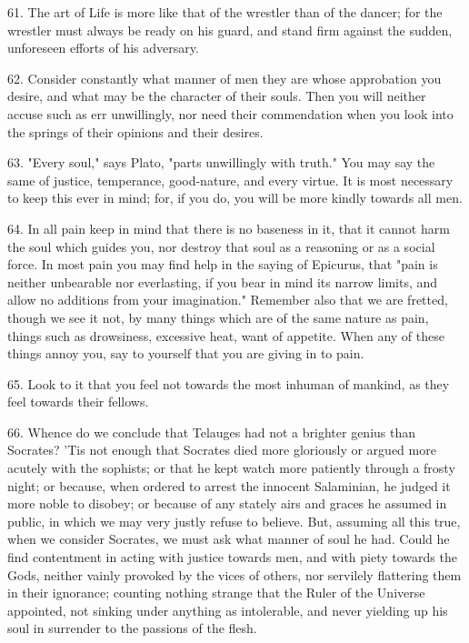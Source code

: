 \documentclass{book}
\begin{document}
61. The art of Life is more like that of the wrestler than of the
dancer; for the wrestler must always be ready on his guard, and stand
firm against the sudden, unforeseen efforts of his adversary.

62. Consider constantly what manner of men they are whose approbation
you desire, and what may be the character of their souls. Then you
will neither accuse such as err unwillingly, nor need their
commendation when you look into the springs of their opinions and
their desires.

63. "Every soul," says Plato, "parts unwillingly with truth." You may
say the same of justice, temperance, good-nature, and every virtue. It
is most necessary to keep this ever in mind; for, if you do, you will
be more kindly towards all men.

64. In all pain keep in mind that there is no baseness in it, that it
cannot harm the soul which guides you, nor destroy that soul as a
reasoning or as a social force. In most pain you may find help in the
saying of Epicurus, that "pain is neither unbearable nor everlasting,
if you bear in mind its narrow limits, and allow no additions from
your imagination." Remember also that we are fretted, though we see it
not, by many things which are of the same nature as pain, things such
as drowsiness, excessive heat, want of appetite. When any of these
things annoy you, say to yourself that you are giving in to pain.

65. Look to it that you feel not towards the most inhuman of mankind,
as they feel towards their fellows.

66. Whence do we conclude that Telauges had not a brighter genius than
Socrates? 'Tis not enough that Socrates died more gloriously or argued
more acutely with the sophists; or that he kept watch more patiently
through a frosty night; or because, when ordered to arrest the
innocent Salaminian, he judged it more noble to disobey; or because of
any stately airs and graces he assumed in public, in which we may very
justly refuse to believe. But, assuming all this true, when we
consider Socrates, we must ask what manner of soul he had. Could he
find contentment in acting with justice towards men, and with piety
towards the Gods, neither vainly provoked by the vices of others, nor
servilely flattering them in their ignorance; counting nothing strange
that the Ruler of the Universe appointed, not sinking under anything
as intolerable, and never yielding up his soul in surrender to the
passions of the flesh.
\end{document}
